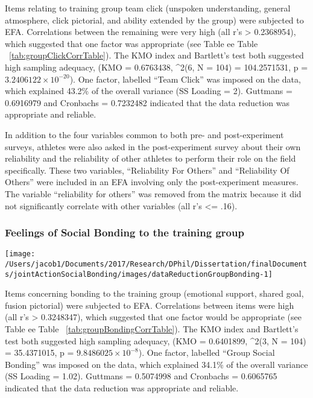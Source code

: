 \documentclass[english]{article}\usepackage[]{graphicx}\usepackage[]{color}
\makeatletter
\def\maxwidth{ %
  \ifdim\Gin@nat@width>\linewidth
    \linewidth
  \else
    \Gin@nat@width
  \fi
}
\newenvironment{knitrout}{}{} %
\makeatother
\begin{document}
Items relating to training group team click (unspoken understanding, general atmosphere, click pictorial, and ability extended by the group) were subjected to EFA.   Correlations between the remaining were very high (all r's > 0.2368954), which suggested that one factor was appropriate (see Table ee Table ~\ref{tab:groupClickCorrTable}). The KMO index and Bartlett's test both suggested high sampling adequacy, (KMO =  0.6763438, \chi^2(6, N = 104) = 104.2571531, p = \ensuremath{3.2406122\times 10^{-20}}).
One factor, labelled ``Team Click'' was imposed on the data, which explained 43.2\% of the overall variance (SS Loading = 2). Guttmans \lambda = 0.6916979 and Cronbachs \alpha = 0.7232482 indicated that the data reduction was appropriate and reliable.

In addition to the four variables common to both pre- and post-experiment surveys, athletes were also asked in the post-experiment survey about their own reliability and the reliability of other athletes to perform their role on the field specifically. These two variables, ``Reliability For Others'' and ``Reliability Of Others'' were included in an EFA involving only the post-experiment measures.  The variable ``reliability for others'' was removed from the matrix because it did not significantly correlate with other variables (all r's <= .16).

\subsubsection{Feelings of Social Bonding to the training group}
\begin{knitrout}
\color{fgcolor}

{\centering \texttt{[image: /Users/jacob1/Documents/2017/Research/DPhil/Dissertation/finalDocuments/jointActionSocialBonding/images/dataReductionGroupBonding-1]} 

}



\end{knitrout}

Items concerning bonding to the training group (emotional support, shared goal, fusion pictorial) were subjected to EFA.  Correlations between items were high (all r's > 0.3248347), which suggested that one factor would be appropriate (see Table ee Table ~\ref{tab:groupBondingCorrTable}). The KMO index and Bartlett's test both suggested high sampling adequacy, (KMO =  0.6401899, \chi^2(3, N = 104) = 35.4371015, p = \ensuremath{9.8486025\times 10^{-8}}).
One factor, labelled ``Group Social Bonding'' was imposed on the data, which explained 34.1\% of the overall variance (SS Loading = 1.02). Guttmans \lambda = 0.5074998 and Cronbachs \alpha = 0.6065765 indicated that the data reduction was appropriate and reliable.
\end{document}
